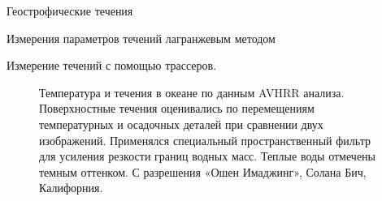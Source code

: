\begin{chapter}{Геострофические течения}
\begin{section}{Измерения параметров течений лагранжевым методом}
\begin{paragraph}{Измерение течений с помощью трассеров.}
\begin{figure}[t!]
\caption{Температура и течения в океане по данным AVHRR
анализа. Поверхностные течения оценивались по перемещениям
температурных и осадочных деталей при сравнении двух
изображений. Применялся специальный пространственный фильтр для
усиления резкости границ водных масс. Теплые воды отмечены темным
оттенком. С разрешения «Ошен Имаджинг», Солана Бич, Калифорния.}
\label{Fig10.16.bw}
\end{figure}
%


\end{paragraph}
\end{section}
\end{chapter}
